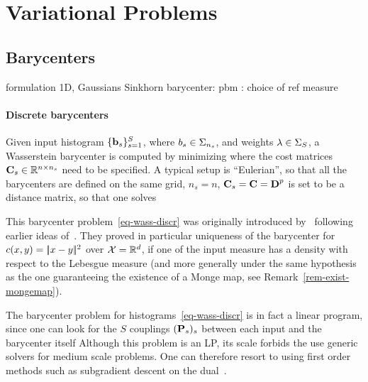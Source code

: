 

\section{Variational Problems}

\subsection{Barycenters}

formulation
   1D, Gaussians
   Sinkhorn barycenter:  pbm : choice of ref measure

\paragraph{Discrete barycenters}
   
Given input histogram $\{\b_s\}_{s=1}^S$, where $b_s \in \simplex_{n_s}$, and weights $\la \in \simplex_S$, a Wasserstein barycenter is computed by minimizing
where the cost matrices $\C_s \in \RR^{n \times n_s}$ need to be specified. 
%
A typical setup is ``Eulerian'', so that all the barycenters are defined on the same grid, $n_s=n$, $\C_s=\C=\distD^p$ is set to be a distance matrix, so that one solves

This barycenter problem~\eqref{eq-wass-discr} was originally introduced by~\cite{Carlier_wasserstein_barycenter} following earlier ideas of~\cite{carlierekelandmatching}. They proved in particular uniqueness of the barycenter for $c(x,y)=\norm{x-y}^2$ over $\X=\RR^d$, if one of the input measure has a density with respect to the Lebesgue measure (and more generally under the same hypothesis as the one guaranteeing the existence of a Monge map, see Remark~\ref{rem-exist-mongemap}).

The barycenter problem for histograms~\eqref{eq-wass-discr} is in fact a linear program, since one can look for the $S$ couplings $(\P_s)_s$ between each input and the barycenter itself
Although this problem is an LP, its scale forbids the use generic solvers for medium scale problems. One can therefore resort to using first order methods such as subgradient descent on the dual~\cite{Carlier-NumericsBarycenters}.

